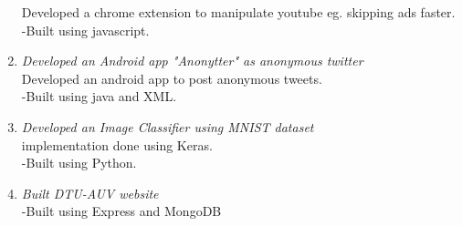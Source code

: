 \documentclass[margin]{res}
\begin{document}
\begin{enumerate}
 Developed a chrome extension to manipulate youtube eg. skipping ads faster.\\
  	-Built using javascript.\\
\item {\large{\sl Developed an Android app "Anonytter" as anonymous twitter}}\\
 Developed an android app to post anonymous tweets.\\
  	-Built using java and XML.\\
\item {\large{\sl Developed an Image Classifier using MNIST dataset}}\\
 implementation done using Keras.\\
  	-Built using Python.\\
\item {\large{\sl Built DTU-AUV website}}\\
 
  	-Built using Express and MongoDB\\




	\end{enumerate}
\end{document}
